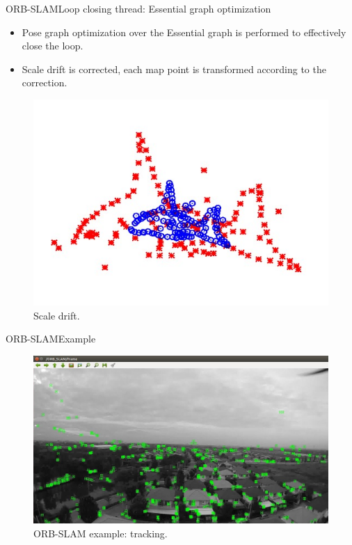 \documentclass[aspectratio=169]{beamer}
\begin{document}
\begin{frame}{ORB-SLAM}{Loop closing thread: Essential graph optimization}
  \begin{itemize}
      \item{
      Pose graph optimization over the Essential graph is performed to effectively close the loop.
      }
      \item{
      Scale drift is corrected, each map point is transformed according to the correction.
      }
  \end{itemize}
  
  \begin{figure}
\includegraphics[scale=0.3]{figs/scaleDrift}
\caption{Scale drift.}
\end{figure}
  
\end{frame}


\begin{frame}{ORB-SLAM}{Example}
  \begin{figure}
\includegraphics[scale=0.3]{figs/ORBtrack}
\caption{ORB-SLAM example: tracking.}
\end{figure}
\end{frame}
\end{document}
